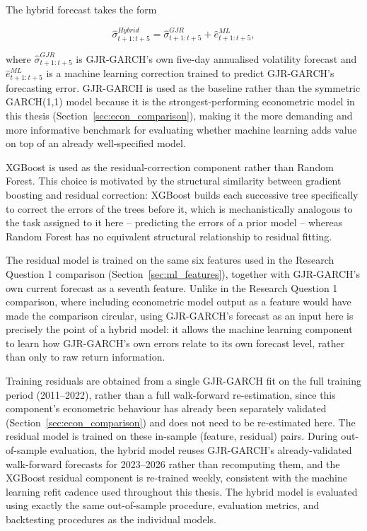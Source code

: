 \documentclass[12pt,a4paper]{article}
\begin{document}
The hybrid forecast takes the form

\begin{equation}
\hat{\sigma}^{Hybrid}_{t+1:t+5}
=
\hat{\sigma}^{GJR}_{t+1:t+5}
+
\hat{e}^{ML}_{t+1:t+5},
\end{equation}

where $\hat{\sigma}^{GJR}_{t+1:t+5}$ is GJR-GARCH's own five-day annualised volatility forecast and
$\hat{e}^{ML}_{t+1:t+5}$ is a machine learning correction trained to predict GJR-GARCH's forecasting
error. GJR-GARCH is used as the baseline rather than the symmetric GARCH(1,1) model because it is
the strongest-performing econometric model in this thesis (Section~\ref{sec:econ_comparison}),
making it the more demanding and more informative benchmark for evaluating whether machine
learning adds value on top of an already well-specified model.

XGBoost is used as the residual-correction component rather than Random Forest. This choice is
motivated by the structural similarity between gradient boosting and residual correction: XGBoost
builds each successive tree specifically to correct the errors of the trees before it, which is
mechanistically analogous to the task assigned to it here -- predicting the errors of a prior model
-- whereas Random Forest has no equivalent structural relationship to residual fitting.

The residual model is trained on the same six features used in the Research Question 1 comparison
(Section~\ref{sec:ml_features}), together with GJR-GARCH's own current forecast as a seventh feature.
Unlike in the Research Question 1 comparison, where including econometric model output as a feature
would have made the comparison circular, using GJR-GARCH's forecast as an input here is precisely
the point of a hybrid model: it allows the machine learning component to learn how GJR-GARCH's own
errors relate to its own forecast level, rather than only to raw return information.

Training residuals are obtained from a single GJR-GARCH fit on the full training period (2011--2022),
rather than a full walk-forward re-estimation, since this component's econometric behaviour has
already been separately validated (Section~\ref{sec:econ_comparison}) and does not need to be
re-estimated here. The residual model is trained on these in-sample (feature, residual) pairs.
During out-of-sample evaluation, the hybrid model reuses GJR-GARCH's already-validated walk-forward
forecasts for 2023--2026 rather than recomputing them, and the XGBoost residual component is
re-trained weekly, consistent with the machine learning refit cadence used throughout this thesis.
The hybrid model is evaluated using exactly the same out-of-sample procedure, evaluation metrics,
and backtesting procedures as the individual models.
\end{document}

